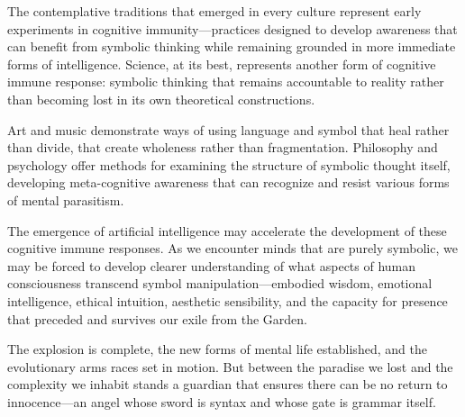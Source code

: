 The contemplative traditions that emerged in every culture represent early experiments in cognitive immunity—practices designed to develop awareness that can benefit from symbolic thinking while remaining grounded in more immediate forms of intelligence. Science, at its best, represents another form of cognitive immune response: symbolic thinking that remains accountable to reality rather than becoming lost in its own theoretical constructions.

Art and music demonstrate ways of using language and symbol that heal rather than divide, that create wholeness rather than fragmentation. Philosophy and psychology offer methods for examining the structure of symbolic thought itself, developing meta-cognitive awareness that can recognize and resist various forms of mental parasitism.

The emergence of artificial intelligence may accelerate the development of these cognitive immune responses. As we encounter minds that are purely symbolic, we may be forced to develop clearer understanding of what aspects of human consciousness transcend symbol manipulation—embodied wisdom, emotional intelligence, ethical intuition, aesthetic sensibility, and the capacity for presence that preceded and survives our exile from the Garden.

\bigskip
\noindent The explosion is complete, the new forms of mental life established, and the evolutionary arms races set in motion. But between the paradise we lost and the complexity we inhabit stands a guardian that ensures there can be no return to innocence—an angel whose sword is syntax and whose gate is grammar itself.
